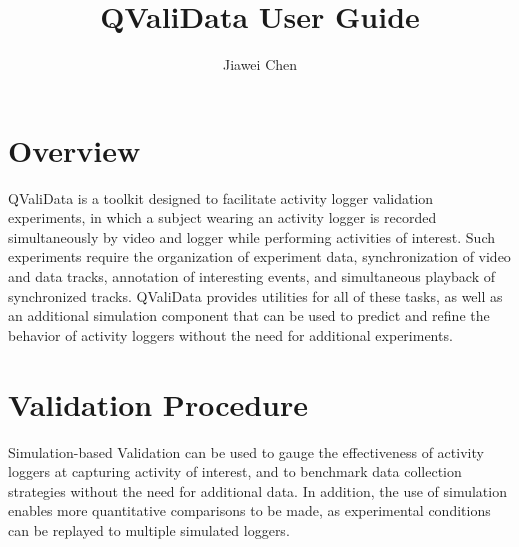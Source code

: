 \documentclass[]{article}
\title{QValiData User Guide}
\author{Jiawei Chen}
\begin{document}
\maketitle

\newpage
\tableofcontents
\newpage
\section{Overview}
QValiData is a toolkit designed to facilitate activity logger validation experiments, in which a subject wearing an activity logger is recorded simultaneously by video and logger while performing activities of interest. Such experiments require the organization of experiment data, synchronization of video and data tracks, annotation of interesting events, and simultaneous playback of synchronized tracks. QValiData provides utilities for all of these tasks, as well as an additional simulation component that can be used to predict and refine the behavior of activity loggers without the need for additional experiments. 

\section{Validation Procedure}
	Simulation-based Validation can be used to gauge the effectiveness of activity loggers at capturing activity of interest, and to benchmark data collection strategies without the need for additional data. In addition, the use of simulation enables more quantitative comparisons to be made, as experimental conditions can be replayed to multiple simulated loggers. 
	
\end{document}
